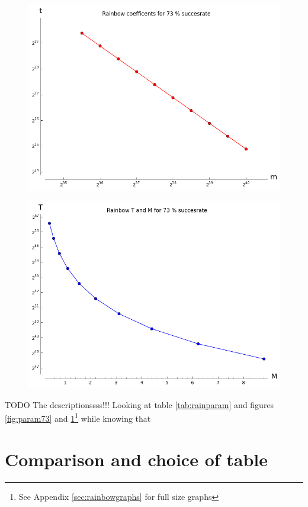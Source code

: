 \begin{figure}[H]
  \centering
  \begin{minipage}{.5\textwidth}
    \centering
    \includegraphics[scale=0.3]{figures/RainbowCoef73.png}
    \label{fig:param73}
  \end{minipage}%
  \begin{minipage}{.5\textwidth}
    \centering
    \includegraphics[scale=0.3]{figures/RainbowTime73.png}
    \label{fig:time73}
  \end{minipage}
\end{figure}

TODO The descriptionssss!!! Looking at table \ref{tab:rainparam} and figures \ref{fig:param73}
and \ref{fig:time73}\footnote{See Appendix \ref{sec:rainbowgraphs} for
  full size graphs} while knowing that

\newpage
\section{Comparison and choice of table}

